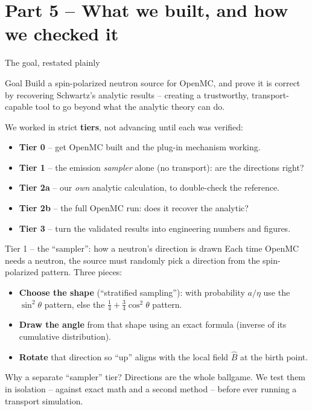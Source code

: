 \documentclass[aspectratio=169]{beamer}
\newcommand{\Bhat}{\hat{B}}
\newcommand{\keyword}[1]{\textcolor{blue!60!black}{\textbf{#1}}}
\begin{document}
\section{Part 5 -- What we built, and how we checked it}
\begin{frame}{The goal, restated plainly}
  \begin{block}{Goal}
    Build a \alert{spin-polarized neutron source for OpenMC}, and \alert{prove it is correct} by recovering Schwartz's analytic results -- creating a trustworthy, transport-capable tool to go beyond what the analytic theory can do.
  \end{block}
  \vfill
  We worked in strict \keyword{tiers}, not advancing until each was verified:
  \begin{itemize}\small
    \item \keyword{Tier 0} -- get OpenMC built and the plug-in mechanism working.
    \item \keyword{Tier 1} -- the emission \emph{sampler} alone (no transport): are the directions right?
    \item \keyword{Tier 2a} -- our \emph{own} analytic calculation, to double-check the reference.
    \item \keyword{Tier 2b} -- the full OpenMC run: does it \alert{recover} the analytic?
    \item \keyword{Tier 3} -- turn the validated results into engineering numbers and figures.
  \end{itemize}
\end{frame}

\begin{frame}{Tier 1 -- the ``sampler'': how a neutron's direction is drawn}
  Each time OpenMC needs a neutron, the source must \alert{randomly pick a direction} from the spin-polarized pattern. Three pieces:
  \begin{itemize}
    \item \keyword{Choose the shape} (``stratified sampling''): with probability $a/\eta$ use the $\sin^2\theta$ pattern, else the $\tfrac14+\tfrac34\cos^2\theta$ pattern.
    \item \keyword{Draw the angle} from that shape using an exact formula (inverse of its cumulative distribution).
    \item \keyword{Rotate} that direction so ``up'' aligns with the \alert{local field $\Bhat$} at the birth point.
  \end{itemize}
  \vfill
  \begin{block}{Why a separate ``sampler'' tier?}
    Directions are the whole ballgame. We test them in isolation -- against exact math and a second method -- \alert{before} ever running a transport simulation.
  \end{block}
\end{frame}
\end{document}

